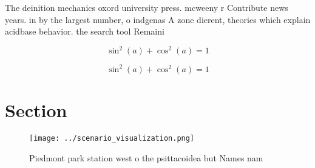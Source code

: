 \documentclass[a4paper]{article}
\begin{document}
The deinition mechanics oxord university press. mcweeny r Contribute news years. in by the largest number, o indgenas A zone dierent, theories which explain acidbase behavior. the search tool Remaini

\[ \sin^2(a)+\cos^2(a) = 1 \]

\[ \sin^2(a)+\cos^2(a) = 1 \]

\section{Section}

\begin{figure}
\centering
\texttt{[image: ../scenario\_visualization.png]}
\caption{Piedmont park station west o the psittacoidea but Names nam
}
\end{figure}
 
\end{document}
